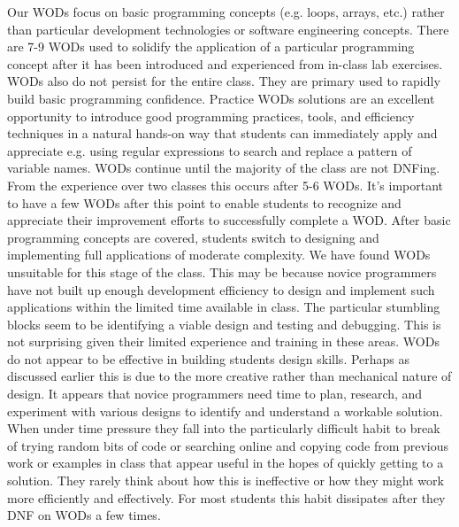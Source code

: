 Our WODs focus on basic programming concepts (e.g. loops, arrays, etc.) rather than particular development technologies or software engineering concepts. There are 7-9 WODs used to solidify the application of a particular programming concept after it has been introduced and experienced from in-class lab exercises. WODs also do not persist for the entire class. They are primary used to rapidly build basic programming confidence. Practice WODs solutions are an excellent opportunity to introduce good programming practices, tools, and efficiency techniques in a natural hands-on way that students can immediately apply and appreciate e.g. using regular expressions to search and replace a pattern of variable names. WODs continue until the majority of the class are not DNFing. From the experience over two classes this occurs after 5-6 WODs. It's important to have a few WODs after this point to enable students to recognize and appreciate their improvement efforts to successfully complete a WOD. After   basic programming concepts are covered, students switch to designing and implementing full applications of moderate complexity. We have found WODs unsuitable for this stage of the class. This may be because novice programmers have not built up enough development efficiency to design and implement such applications within the limited time available in class. The particular stumbling blocks seem to be identifying a viable design and testing and debugging. This is not surprising given their limited experience and training in these areas. WODs do not appear to be effective in building students design skills. Perhaps as discussed earlier this is due to the more creative rather than mechanical nature of design. It appears that novice programmers need time to plan, research, and experiment with various designs to identify and understand a workable solution. When under time pressure they fall into the particularly difficult habit to break of trying random bits of code or searching online and copying code from previous work or examples in class that appear useful in the hopes of quickly getting to a solution. They rarely think about how this is ineffective or how they might work more efficiently and effectively. For most students this habit dissipates after they DNF on WODs a few times.

